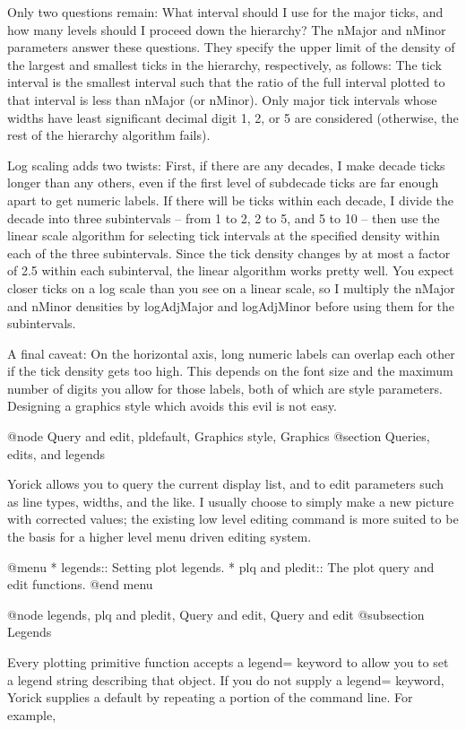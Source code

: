 Only two questions remain: What interval should I use for the major
ticks, and how many levels should I proceed down the hierarchy?  The
nMajor and nMinor parameters answer these questions.  They specify the
upper limit of the density of the largest and smallest ticks in the
hierarchy, respectively, as follows: The tick interval is the smallest
interval such that the ratio of the full interval plotted to that
interval is less than nMajor (or nMinor).  Only major tick intervals
whose widths have least significant decimal digit 1, 2, or 5 are
considered (otherwise, the rest of the hierarchy algorithm fails).

Log scaling adds two twists: First, if there are any decades, I make
decade ticks longer than any others, even if the first level of
subdecade ticks are far enough apart to get numeric labels.  If there
will be ticks within each decade, I divide the decade into three
subintervals -- from 1 to 2, 2 to 5, and 5 to 10 -- then use the
linear scale algorithm for selecting tick intervals at the specified
density within each of the three subintervals.  Since the tick density
changes by at most a factor of 2.5 within each subinterval, the linear
algorithm works pretty well.  You expect closer ticks on a log scale
than you see on a linear scale, so I multiply the nMajor and nMinor
densities by logAdjMajor and logAdjMinor before using them for the
subintervals.

A final caveat: On the horizontal axis, long numeric labels can
overlap each other if the tick density gets too high.  This depends on
the font size and the maximum number of digits you allow for those
labels, both of which are style parameters.  Designing a graphics
style which avoids this evil is not easy.

@node Query and edit, pldefault, Graphics style, Graphics
@section Queries, edits, and legends

Yorick allows you to query the current display list, and to edit
parameters such as line types, widths, and the like.  I usually choose
to simply make a new picture with corrected values; the existing low
level editing command is more suited to be the basis for a higher
level menu driven editing system.

@menu
* legends::                     Setting plot legends.
* plq and pledit::              The plot query and edit functions.
@end menu

@node legends, plq and pledit, Query and edit, Query and edit
@subsection Legends

Every plotting primitive function accepts a legend= keyword to allow
you to set a legend string describing that object.  If you do not
supply a legend= keyword, Yorick supplies a default by repeating a
portion of the command line.  For example,

